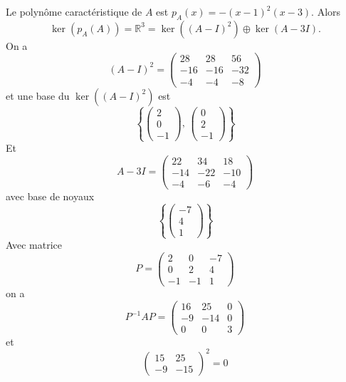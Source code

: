 \begin{remark}
\begin{example}
Le polynôme caractéristique de $A$ est $p_A(x) = -  (x-1)^2 (x-3)$. Alors
\begin{displaymath}
  \ker(p_A(A))  = ℝ^3 = \ker\left((A - I)^2\right) ⊕  \ker(A - 3I). 
\end{displaymath}
On a
\begin{displaymath}
(A - I)^2 =   \left(\begin{array}{rrr}
28 & 28 & 56 \\
-16 & -16 & -32 \\
-4 & -4 & -8
\end{array}\right)
\end{displaymath}
et une base du $\ker\left((A - I)^2\right)$ est
\begin{displaymath}
  \left\{
    \begin{pmatrix}
      2\\0\\-1
    \end{pmatrix}, \,
    \begin{pmatrix}
      0\\2\\ -1
    \end{pmatrix}
\right\} 
\end{displaymath}
Et
\begin{displaymath}
A - 3I =   \left(\begin{array}{rrr}
22 & 34 & 18 \\
-14 & -22 & -10 \\
-4 & -6 & -4
                 \end{array}\right)               
\end{displaymath}
avec base de noyaux
\begin{displaymath}
  \left\{
    \begin{pmatrix}
      -7 \\ 4 \\ 1
    \end{pmatrix} \right\} 
\end{displaymath}
Avec matrice
\begin{displaymath}
  P = \left(\begin{array}{rrr}
2 & 0 & -7 \\
0 & 2 & 4 \\
-1 & -1 & 1
\end{array}\right)
\end{displaymath}
on a
\begin{displaymath}
  P^{-1}AP = \left(\begin{array}{rrr}
16 & 25 & 0 \\
-9 & -14 & 0 \\
0 & 0 & 3
                   \end{array}\right)                 
\end{displaymath}
et
\begin{displaymath}
\left(\begin{array}{rr}
15 & 25 \\
-9 & -15
\end{array}\right)^2 = 0 
\end{displaymath}


\end{example}
\end{remark}
